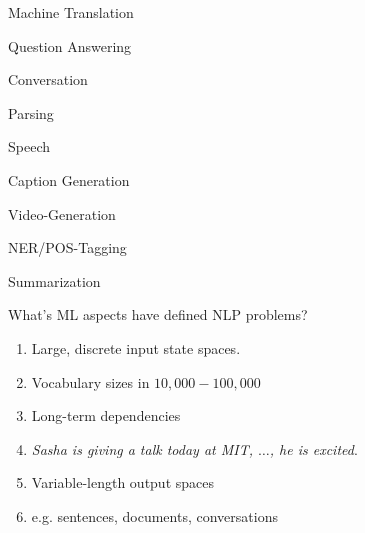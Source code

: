 \documentclass{beamer}
\let\tempone\itemize
\let\temptwo\enditemize
\renewenvironment{itemize}{\tempone\addtolength{\itemsep}{0.5\baselineskip}}{\temptwo}
\newcommand{\air}{\vspace{0.25cm}}
\newcommand{\Cite}[1]{{\footnotesize \citep{#1}}}
\begin{document}
\begin{frame}{}
  \begin{center}
  \end{center}

  \begin{itemize}
  \item \alert<2>{Machine Translation} \Cite{kalchbrenner2013recurrent,sutskever2014sequence, Cho2014, bahdanau2014neural,luong15effective} 
    \air

   
  \item Question Answering \Cite{Hermann2015} 
  \item Conversation \Cite{Vinyals2015} \Cite{Serban2016}
  \item Parsing \Cite{vinyals15grammar}
  \item Speech \Cite{Chorowski2015,Chan2015}
  \item Caption Generation \Cite{karpathy2015deep,Xu2015,Vinyals2015b}
  \item Video-Generation \Cite{Srivastava2015a}
  \item NER/POS-Tagging \Cite{Gillick2016}
  \item Summarization \Cite{Rush2015} 
    \air 

  \end{itemize}
  
\end{frame}


\begin{frame}{}
  \begin{center}
    What's ML aspects have defined NLP problems? 
  \end{center}

  \begin{enumerate}
    \air
  \item  Large, discrete input state spaces.
    \begin{itemize}
    \item Vocabulary sizes in $10,000 - 100,000$
    \end{itemize}
    \air
  \item  Long-term dependencies
    \begin{itemize}
    \item \textit{Sasha is  giving a talk today at MIT, $\ldots$, he is excited}.  
    \end{itemize}
    \air
  \item Variable-length output spaces 
    \begin{itemize}
    \item  e.g. sentences, documents, conversations
    \end{itemize}
    \air
  \end{enumerate}
\end{frame}
\end{document}
